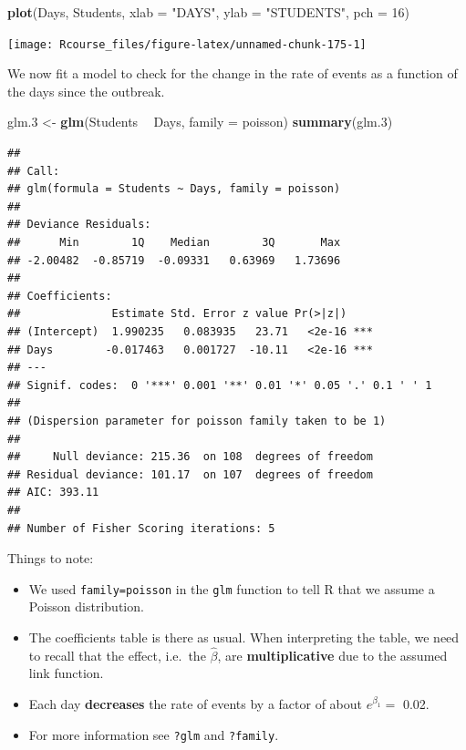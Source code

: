 \documentclass[]{book}
\newenvironment{Shaded}{\begin{snugshade}}{\end{snugshade}}
\newcommand{\KeywordTok}[1]{\textcolor[rgb]{0.13,0.29,0.53}{\textbf{#1}}}
\newcommand{\DataTypeTok}[1]{\textcolor[rgb]{0.13,0.29,0.53}{#1}}
\newcommand{\DecValTok}[1]{\textcolor[rgb]{0.00,0.00,0.81}{#1}}
\newcommand{\StringTok}[1]{\textcolor[rgb]{0.31,0.60,0.02}{#1}}
\newcommand{\OperatorTok}[1]{\textcolor[rgb]{0.81,0.36,0.00}{\textbf{#1}}}
\newcommand{\NormalTok}[1]{#1}
\providecommand{\tightlist}{%
  \setlength{\itemsep}{0pt}\setlength{\parskip}{0pt}}
\theoremstyle{definition}
\theoremstyle{definition}
\theoremstyle{definition}
\theoremstyle{remark}
\begin{document}
\begin{Shaded}
\begin{Highlighting}[]
\KeywordTok{plot}\NormalTok{(Days, Students, }\DataTypeTok{xlab =} \StringTok{"DAYS"}\NormalTok{, }\DataTypeTok{ylab =} \StringTok{"STUDENTS"}\NormalTok{, }\DataTypeTok{pch =} \DecValTok{16}\NormalTok{)}
\end{Highlighting}
\end{Shaded}

\texttt{[image: Rcourse\_files/figure-latex/unnamed-chunk-175-1]}

We now fit a model to check for the change in the rate of events as a
function of the days since the outbreak.

\begin{Shaded}
\begin{Highlighting}[]
\NormalTok{glm.}\DecValTok{3}\NormalTok{ <-}\StringTok{ }\KeywordTok{glm}\NormalTok{(Students }\OperatorTok{~}\StringTok{ }\NormalTok{Days, }\DataTypeTok{family =}\NormalTok{ poisson)}
\KeywordTok{summary}\NormalTok{(glm.}\DecValTok{3}\NormalTok{)}
\end{Highlighting}
\end{Shaded}

\begin{verbatim}
## 
## Call:
## glm(formula = Students ~ Days, family = poisson)
## 
## Deviance Residuals: 
##      Min        1Q    Median        3Q       Max  
## -2.00482  -0.85719  -0.09331   0.63969   1.73696  
## 
## Coefficients:
##              Estimate Std. Error z value Pr(>|z|)    
## (Intercept)  1.990235   0.083935   23.71   <2e-16 ***
## Days        -0.017463   0.001727  -10.11   <2e-16 ***
## ---
## Signif. codes:  0 '***' 0.001 '**' 0.01 '*' 0.05 '.' 0.1 ' ' 1
## 
## (Dispersion parameter for poisson family taken to be 1)
## 
##     Null deviance: 215.36  on 108  degrees of freedom
## Residual deviance: 101.17  on 107  degrees of freedom
## AIC: 393.11
## 
## Number of Fisher Scoring iterations: 5
\end{verbatim}

Things to note:

\begin{itemize}
\tightlist
\item
  We used \texttt{family=poisson} in the \texttt{glm} function to tell R
  that we assume a Poisson distribution.
\item
  The coefficients table is there as usual. When interpreting the table,
  we need to recall that the effect, i.e.~the \(\hat \beta\), are
  \textbf{multiplicative} due to the assumed link function.
\item
  Each day \textbf{decreases} the rate of events by a factor of about
  \(e^{\beta_1}=\) 0.02.
\item
  For more information see \texttt{?glm} and \texttt{?family}.
\end{itemize}
\end{document}
